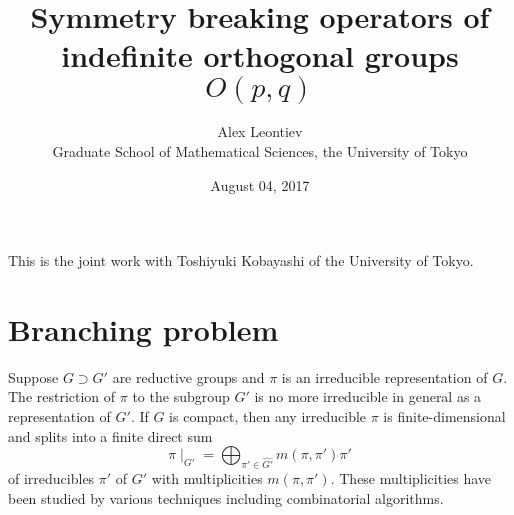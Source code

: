 \documentclass[10pt]{article} %
\title{Symmetry breaking operators of indefinite orthogonal groups $O(p,q)$}
\author{Alex Leontiev\\Graduate School of Mathematical Sciences, the University of Tokyo}
\date{August 04, 2017}
\theoremstyle{definition}
\begin{document}
	\maketitle

	This is the joint work with Toshiyuki Kobayashi of the University of Tokyo.
\section{Branching problem}

Suppose $G \supset G'$ are reductive groups and $\pi$ is an irreducible
representation of $G$. 
The restriction of $\pi$ to the subgroup $G'$ is no more irreducible in general as a representation
of $G'$. If $G$ is compact, then any irreducible $\pi$ is finite-dimensional and splits
into a finite direct sum
\[ \pi\!\mid_{G'} = \bigoplus_{\pi' \in \widehat{G'}} m (\pi, \pi') \pi' \]
of irreducibles $\pi'$ of $G'$ with multiplicities $m(\pi,\pi')$. These multiplicities have been studied
by various techniques including combinatorial algorithms.
\end{document}
